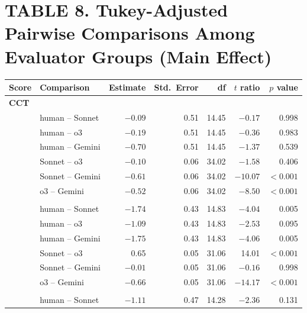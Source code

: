 \documentclass{wiley-article}
\begin{document}
\begin{table}[htbp]
  \section*{TABLE 8. Tukey-Adjusted Pairwise Comparisons Among Evaluator Groups (Main Effect)}
  \centering
  \footnotesize                       %
  \setlength{\tabcolsep}{4pt}         %
  \begin{threeparttable}
    \label{tab:tukey_evaluator}
    \begin{tabular}{l p{} r r r r r}
      \toprule
      \textbf{Score} & \textbf{Comparison} & \textbf{Estimate} &
      \textbf{Std.\ Error} & \textbf{df} & \textbf{$t$ ratio} & \textbf{$p$ value} \\
      \midrule
      \multicolumn{7}{l}{\textbf{CCT}}\\
      & human – Sonnet   & $-0.09$ & 0.51 & 14.45 & $-0.17$ & 0.998 \\
      & human – o3       & $-0.19$ & 0.51 & 14.45 & $-0.36$ & 0.983 \\
      & human – Gemini   & $-0.70$ & 0.51 & 14.45 & $-1.37$ & 0.539 \\
      & Sonnet – o3      & $-0.10$ & 0.06 & 34.02 & $-1.58$ & 0.406 \\
      & Sonnet – Gemini  & $-0.61$ & 0.06 & 34.02 & $-10.07$ & $<\!0.001$ \\
      & o3 – Gemini      & $-0.52$ & 0.06 & 34.02 & $-8.50$ & $<\!0.001$ \\
      \addlinespace
      \multicolumn{7}{l}{\textbf{SST}}\\
      & human – Sonnet   & $-1.74$ & 0.43 & 14.83 & $-4.04$ & 0.005 \\
      & human – o3       & $-1.09$ & 0.43 & 14.83 & $-2.53$ & 0.095 \\
      & human – Gemini   & $-1.75$ & 0.43 & 14.83 & $-4.06$ & 0.005 \\
      & Sonnet – o3      &  0.65   & 0.05 & 31.06 & 14.01   & $<\!0.001$ \\
      & Sonnet – Gemini  & $-0.01$ & 0.05 & 31.06 & $-0.16$ & 0.998 \\
      & o3 – Gemini      & $-0.66$ & 0.05 & 31.06 & $-14.17$& $<\!0.001$ \\
      \addlinespace
      \multicolumn{7}{l}{\textbf{PAR}}\\
      & human – Sonnet   & $-1.11$ & 0.47 & 14.28 & $-2.36$ & 0.131 \\

\end{tabular}
\end{threeparttable}
\end{table}
\end{document}
